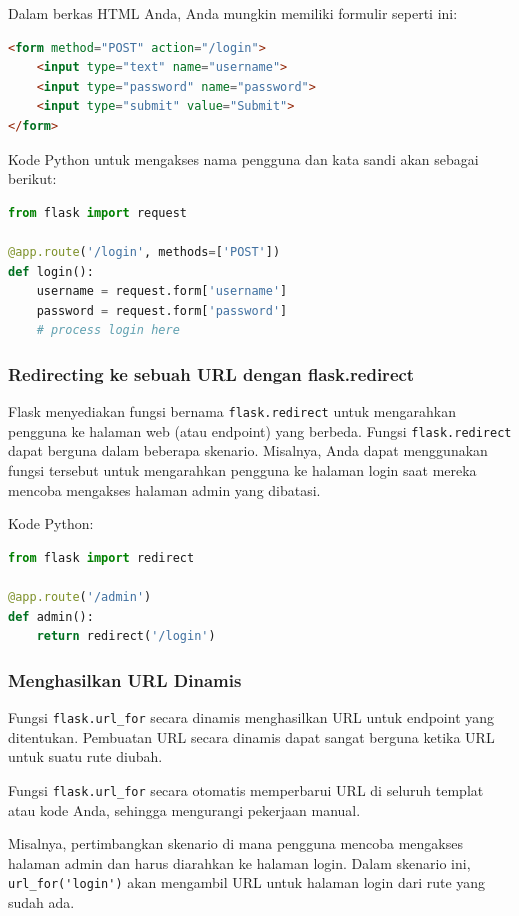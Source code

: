 \documentclass{article}
\begin{document}
Dalam berkas HTML Anda, Anda mungkin memiliki formulir seperti ini:
\begin{lstlisting}[language=HTML, caption={}, captionpos=b]
<form method="POST" action="/login">
    <input type="text" name="username">
    <input type="password" name="password">
    <input type="submit" value="Submit">
</form>
\end{lstlisting}

Kode Python untuk mengakses nama pengguna dan kata sandi akan sebagai berikut:
\begin{lstlisting}[language=Python, caption={}, captionpos=b]
from flask import request

@app.route('/login', methods=['POST'])
def login():
    username = request.form['username']
    password = request.form['password']
    # process login here
\end{lstlisting}

\subsubsection{Redirecting ke sebuah URL dengan flask.redirect}
Flask menyediakan fungsi bernama \verb|flask.redirect| untuk mengarahkan pengguna ke halaman web (atau endpoint) yang berbeda. Fungsi \verb|flask.redirect| dapat berguna dalam beberapa skenario. Misalnya, Anda dapat menggunakan fungsi tersebut untuk mengarahkan pengguna ke halaman login saat mereka mencoba mengakses halaman admin yang dibatasi.

Kode Python:
\begin{lstlisting}[language=Python, caption={}, captionpos=b]
from flask import redirect

@app.route('/admin')
def admin():
    return redirect('/login')
\end{lstlisting}

\subsubsection{Menghasilkan URL Dinamis}
Fungsi \verb|flask.url_for| secara dinamis menghasilkan URL untuk endpoint yang ditentukan. Pembuatan URL secara dinamis dapat sangat berguna ketika URL untuk suatu rute diubah.

Fungsi \verb|flask.url_for| secara otomatis memperbarui URL di seluruh templat atau kode Anda, sehingga mengurangi pekerjaan manual.

Misalnya, pertimbangkan skenario di mana pengguna mencoba mengakses halaman admin dan harus diarahkan ke halaman login. Dalam skenario ini, \verb|url_for('login')| akan mengambil URL untuk halaman login dari rute yang sudah ada.
\end{document}
